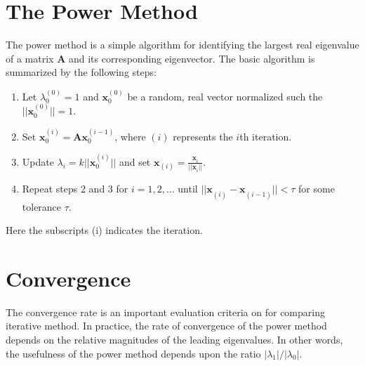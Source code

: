 \section{The Power Method}
The power method is a simple algorithm for identifying the largest real eigenvalue of a matrix $\mathbf{A}$ and its corresponding eigenvector. The basic algorithm is summarized by the following steps:
\begin{enumerate}
  \item Let $\lambda^{(0)}_0 =1 $ and $\mathbf{x}^{(0)}_0$ be a random, real vector normalized such the $||\mathbf{x}^{(0)}_0|| = 1$.
  \item Set $\mathbf{x}^{(i)}_0=\mathbf{A}\mathbf{x}^{(i-1)}_0$, where $(i)$ represents the $i$th iteration.
  \item Update $\lambda_{i} = k||\mathbf{x}^{(i)}_0||$ and set  $\mathbf{x}_{(i)} =\frac{\mathbf{x}^{}_{i}}{||\mathbf{x}^{}_{i}||}$.
  \item Repeat steps 2 and 3 for $i = 1, 2, \ldots$ until $||\mathbf{x}^{}_{(i)} - \mathbf{x}^{}_{(i-1)}|| < \tau$ for some tolerance $\tau$.
\end{enumerate}
Here the subscripts (i) indicates the iteration.

\section{Convergence}
\label{sec:convergence}
The convergence rate is an important evaluation criteria on for comparing iterative method. 
In practice, the rate of convergence of the power method depends on the relative magnitudes of the leading eigenvalues. 
In other words, the usefulness of the power method depends upon the ratio $|\lambda_1|/|\lambda_0|$.

